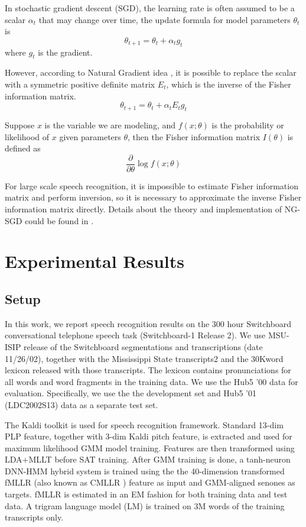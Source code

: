 \documentclass{article}
\begin{document}
In stochastic gradient descent (SGD), the learning rate is often assumed to be a scalar $\alpha_t$ that may change over time,
the update formula for model parameters $\theta_{t}$ is
\begin{equation}
\theta_{t+1} = \theta_{t} + \alpha_t g_t
\end{equation}
where $g_t$ is the gradient.

However, according to Natural Gradient idea \cite{murata1999statistical,roux2008topmoumoute}, it is possible to replace 
the scalar with a symmetric positive definite matrix $E_t$, which is the inverse of the Fisher information matrix.
\begin{equation}
\theta_{t+1} = \theta_{t} + \alpha_t E_t g_t
\end{equation}

Suppose $x$ is the variable we are modeling, and $f(x;\theta)$ is the probability or likelihood of $x$ given parameters $\theta$, then the
Fisher information matrix $I(\theta)$ is defined as
\begin{equation}
\frac{\partial}{\partial\theta}\log f(x;\theta)
\end{equation}

For large scale speech recognition, it is impossible to estimate Fisher information matrix and perform inversion, 
so it is necessary to approximate the inverse Fisher information matrix directly. Details about the theory and 
implementation of NG-SGD could be found in \cite{povey2014parallel}.

\section{Experimental Results}
\subsection{Setup}
In this work, we report speech recognition results on the 300 hour Switchboard conversational telephone speech task 
(Switchboard-1 Release 2). We use MSU-ISIP release of the Switchboard segmentations and transcriptions (date 11/26/02),
together with the Mississippi State transcripts2 and the 30Kword lexicon released with those transcripts. 
The lexicon contains pronunciations for all words and word fragments in the training data. We use the Hub5 ’00 data for
evaluation. Specifically, we use the  the development set and Hub5 ’01 (LDC2002S13) data as a separate test set.

The Kaldi toolkit\cite{kaldi11} is used for speech recognition framework. Standard 13-dim PLP feature,
together with 3-dim Kaldi pitch feature, is extracted and used for maximum
likelihood GMM model training. Features are then transformed using LDA+MLLT before SAT training.
After GMM training is done, a tanh-neuron DNN-HMM hybrid system is trained using the the 40-dimension 
transformed fMLLR (also known as CMLLR \cite{gales1996generation}) feature as input and GMM-aligned senones 
as targets. fMLLR is estimated in an EM fashion for both training data and test data. A trigram language model (LM) is trained 
on 3M words of the training transcripts only.
\end{document}
